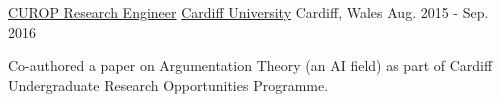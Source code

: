 \begin{cventries}
  \cventry
    {\href{https://www.cardiff.ac.uk/study/undergraduate/why-study-with-us/leaders-in-research/research-opportunities}{CUROP Research Engineer}}
    {\href{https://www.cardiff.ac.uk/}{Cardiff University}}
    {Cardiff, Wales}
    {Aug. 2015 - Sep. 2016}
    {
      \begin{cvitems}
        \item Co-authored a paper on Argumentation Theory (an AI field) as part of Cardiff Undergraduate Research Opportunities Programme.
      \end{cvitems}
    }
    {}
\end{cventries}
